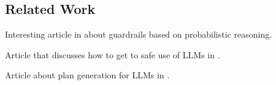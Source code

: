 %

\subsection{Related Work}

Interesting article in \citep{kang2024r} about guardrails based on probabilistic reasoning.

Article that discusses how to get to safe use of LLMs in \citep{wu2024medical}.

Article about plan generation for LLMs in \citep{hsu2025medplan}.